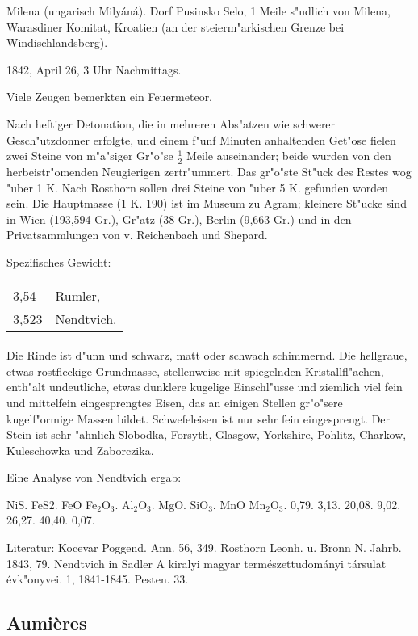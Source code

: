 \documentclass[a4paper, 11pt, oneside]{article}
\begin{document}
Milena (ungarisch Milyáná). Dorf Pusinsko Selo, 1 Meile s"udlich von Milena, Warasdiner Komitat, Kroatien (an der steierm"arkischen Grenze bei Windischlandsberg).

1842, April 26, 3 Uhr Nachmittags.

Viele Zeugen bemerkten ein Feuermeteor.

Nach heftiger Detonation, die in mehreren Abs"atzen wie schwerer Gesch"utzdonner erfolgte, und einem f"unf Minuten anhaltenden Get"ose fielen zwei Steine von m"a"siger Gr"o"se $\frac{1}{2}$ Meile auseinander; beide wurden von den herbeistr"omenden Neugierigen zertr"ummert. Das gr"o"ste St"uck des Restes wog "uber 1 K. Nach Rosthorn sollen drei Steine von "uber 5 K. gefunden worden sein. Die Hauptmasse (1 K. 190) ist im Museum zu Agram; kleinere St"ucke sind in Wien (193,594 Gr.), Gr"atz (38 Gr.), Berlin (9,663 Gr.) und in den Privatsammlungen von v. Reichenbach und Shepard.

Spezifisches Gewicht:  
\begin{table}[!ht]
    \centering
    \begin{tabular}{l l}
        3,54 & Rumler,\\
        3,523 & Nendtvich.
    \end{tabular}
\end{table}
\paragraph{}
Die Rinde ist d"unn und schwarz, matt oder schwach schimmernd. Die hellgraue, etwas rostfleckige Grundmasse, stellenweise mit spiegelnden Kristallfl"achen, enth"alt undeutliche, etwas dunklere kugelige Einschl"usse und ziemlich viel fein und mittelfein eingesprengtes Eisen, das an einigen Stellen gr"o"sere kugelf"ormige Massen bildet. Schwefeleisen ist nur sehr fein eingesprengt. Der Stein ist sehr "ahnlich Slobodka, Forsyth, Glasgow, Yorkshire, Pohlitz, Charkow, Kuleschowka und Zaborczika.

Eine Analyse von Nendtvich ergab:

NiS. FeS2. FeO Fe$_{2}$O$_{3}$. Al$_{2}$O$_{3}$. MgO. SiO$_{3}$. MnO Mn$_{2}$O$_{3}$.  
0,79. 3,13. 20,08. 9,02. 26,27. 40,40. 0,07.

Literatur: Kocevar Poggend. Ann. 56, 349. Rosthorn Leonh. u. Bronn N. Jahrb. 1843, 79. Nendtvich in Sadler A kiralyi magyar természettudományi társulat évk"onyvei. 1, 1841-1845. Pesten. 33.

\subsection{Aumières}
\end{document}
